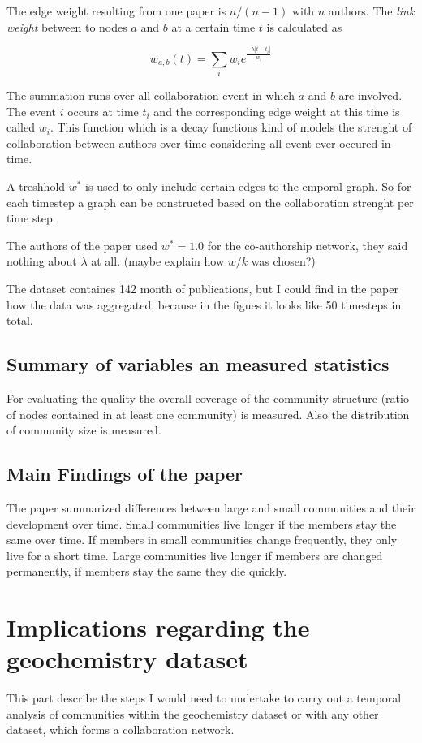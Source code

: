 \documentclass[runningheads,a4paper]{llncs}
\begin{document}
The edge weight resulting from one paper is $n/(n-1)$ with $n$ authors. The \emph{link weight} between to nodes $a$ and $b$ at a certain time $t$ is calculated as

$$w_{a,b}(t)= \sum_{i}^{} w_i e^{\frac{-\lambda \left|t-t_i\right|}{w_i}}$$

The summation runs over all collaboration event in which $a$ and $b$ are involved. The event $i$ occurs at time $t_i$ and the corresponding edge weight at this time is called $w_i$. This function which is a decay functions kind of models the strenght of collaboration between authors over time considering all event ever occured in time.

A treshhold $w^*$ is used to only include certain edges to the emporal graph. So for each timestep a graph can be constructed based on the collaboration strenght per time step.

The authors of the paper used $w^*=1.0$ for the co-authorship network, they said nothing about $\lambda$ at all. (maybe explain how $w/k$ was chosen?)

The dataset containes 142 month of publications, but I could find in the paper how the data was aggregated, because in the figues it looks like 50 timesteps in total.

\subsection{Summary of variables an measured statistics}
\label{evolution-vars}
For evaluating the quality the overall coverage of the community structure (ratio of nodes contained in at least one community) is measured. Also the distribution of community size is measured.

\subsection{Main Findings of the paper}
\label{evolution-findings}
The paper summarized differences between large and small communities and their development over time. Small communities live longer if the members stay the same over time. If members in small communities change frequently, they only live for a short time. Large communities live longer if members are changed permanently, if members stay the same they die quickly.

\section{Implications regarding the geochemistry dataset}
This part describe the steps I would need to undertake to carry out a temporal analysis of communities within the geochemistry dataset or with any other dataset, which forms a collaboration network.
\end{document}
